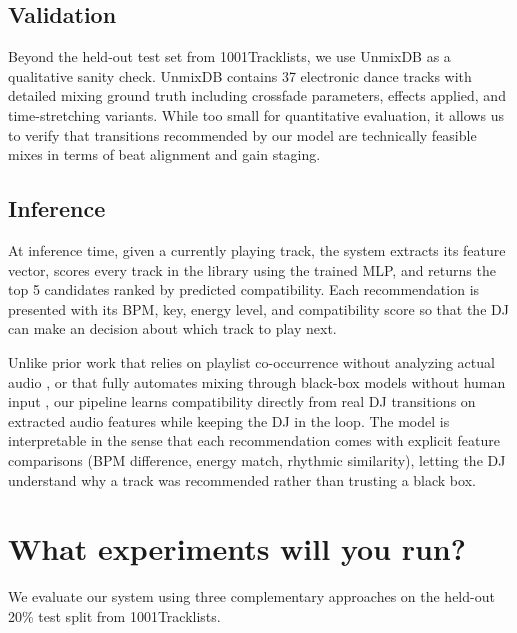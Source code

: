 \documentclass[10pt]{article}
\begin{document}
\subsection*{Validation}

Beyond the held-out test set from 1001Tracklists, we use UnmixDB \cite{unmixdb} as a qualitative sanity check. UnmixDB contains 37 electronic dance tracks with detailed mixing ground truth including crossfade parameters, effects applied, and time-stretching variants. While too small for quantitative evaluation, it allows us to verify that transitions recommended by our model are technically feasible mixes in terms of beat alignment and gain staging.

\subsection*{Inference}

At inference time, given a currently playing track, the system extracts its feature vector, scores every track in the library using the trained MLP, and returns the top 5 candidates ranked by predicted compatibility. Each recommendation is presented with its BPM, key, energy level, and compatibility score so that the DJ can make an decision about which track to play next.

Unlike prior work that relies on playlist co-occurrence without analyzing actual audio \cite{aljanaki2017}, or that fully automates mixing through black-box models without human input \cite{arxiv2021}, our pipeline learns compatibility directly from real DJ transitions on extracted audio features while keeping the DJ in the loop. The model is interpretable in the sense that each recommendation comes with explicit feature comparisons (BPM difference, energy match, rhythmic similarity), letting the DJ understand why a track was recommended rather than trusting a black box.

\section{What experiments will you run?}

We evaluate our system using three complementary approaches on the held-out 20\% test split from 1001Tracklists.
\end{document}
